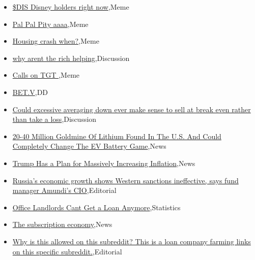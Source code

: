 \documentclass{article}%
\begin{document}
%
\begin{itemize}%
\item%
\href{https://reddit.com/r/wallstreetbets/comments/183gn6l/dis\_disney\_holders\_right\_now/}{\$DIS Disney holders right now},Meme%
\item%
\href{https://reddit.com/r/wallstreetbets/comments/183g9fo/pal\_pal\_pity\_aaaa/}{Pal Pal Pity aaaa},Meme%
\item%
\href{https://reddit.com/r/wallstreetbets/comments/183ezza/housing\_crash\_when/}{Housing crash when?},Meme%
\item%
\href{https://reddit.com/r/wallstreetbets/comments/183emkz/why\_arent\_the\_rich\_helping/}{why arent the rich helping},Discussion%
\item%
\href{https://reddit.com/r/wallstreetbets/comments/183dign/calls\_on\_tgt/}{Calls on TGT },Meme%
\item%
\href{https://reddit.com/r/Baystreetbets/comments/1830vpz/betv/}{BET.V},DD%
\item%
\href{https://reddit.com/r/StockMarket/comments/1830t75/could\_excessive\_averaging\_down\_ever\_make\_sense\_to/}{Could excessive averaging down ever make sense to sell at break even rather than take a loss},Discussion%
\item%
\href{https://reddit.com/r/Economics/comments/1838sew/2040\_million\_goldmine\_of\_lithium\_found\_in\_the\_us/}{20-40 Million Goldmine Of Lithium Found In The U.S. And Could Completely Change The EV Battery Game},News%
\item%
\href{https://reddit.com/r/Economics/comments/1838o3y/trump\_has\_a\_plan\_for\_massively\_increasing/}{Trump Has a Plan for Massively Increasing Inflation},News%
\item%
\href{https://reddit.com/r/Economics/comments/182w1d5/russias\_economic\_growth\_shows\_western\_sanctions/}{Russia's economic growth shows Western sanctions ineffective, says fund manager Amundi's CIO},Editorial%
\item%
\href{https://reddit.com/r/Economics/comments/182v8ei/office\_landlords\_cant\_get\_a\_loan\_anymore/}{Office Landlords Cant Get a Loan Anymore},Statistics%
\item%
\href{https://reddit.com/r/Economics/comments/182upxp/the\_subscription\_economy/}{The subscription economy},News%
\item%
\href{https://reddit.com/r/Economics/comments/182tkow/why\_is\_this\_allowed\_on\_this\_subreddit\_this\_is\_a/}{Why is this allowed on this subreddit? This is a loan company farming links on this specific subreddit.},Editorial%
\end{itemize}%
\end{document}
